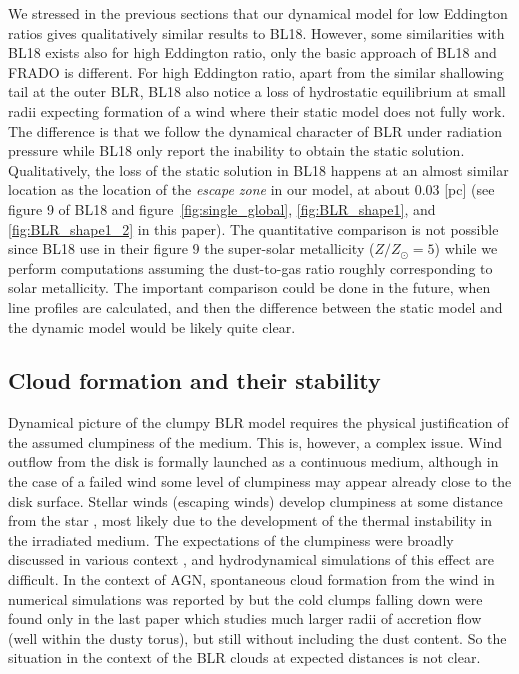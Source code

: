 \documentclass[twocolumn]{aastex62}
\begin{document}
We stressed in the previous sections that our dynamical model for low Eddington ratios gives qualitatively similar results to BL18. However, some similarities with BL18 exists also for high Eddington ratio, only the basic approach of BL18 and FRADO is different. For high Eddington ratio, apart from the similar shallowing tail at the outer BLR, BL18 also notice a loss of hydrostatic equilibrium at small radii expecting formation of a wind where their static model does not fully work. The difference is that we follow the dynamical character of BLR under radiation pressure while BL18 only report the inability to obtain the static solution. Qualitatively, the loss of the static solution in BL18 happens at an almost similar location as the location of the \emph{escape zone} in our model, at about 0.03 [pc] (see figure 9 of BL18 and figure~\ref{fig:single_global}, \ref{fig:BLR_shape1}, and \ref{fig:BLR_shape1_2} in this paper). The quantitative comparison is not possible since BL18 use in their figure 9 the super-solar metallicity ($Z/Z_{\odot} = 5$) while we perform computations assuming the dust-to-gas ratio roughly corresponding to solar metallicity. The important comparison could be done in the future, when line profiles are calculated, and then the difference between the static model and the dynamic model would be likely quite clear.

\subsection{Cloud formation and their stability}\label{sec:stability}

Dynamical picture of the clumpy BLR model requires the physical justification of the assumed clumpiness of the medium. This is, however, a complex issue. Wind outflow from the disk is formally launched as a continuous medium, although in the case of a failed wind some level of clumpiness may appear already close to the disk surface. Stellar winds (escaping winds) develop clumpiness at some distance from the star \citep[e.g.][]{muijres2011}, most likely due to the development of the thermal instability in the irradiated medium. The expectations of the clumpiness were broadly discussed in various context  \citep[see e.g.][and the references therein]{mccourt2018,gronke2020}, and hydrodynamical simulations of this effect are difficult. In the context of AGN, spontaneous cloud formation from the wind in numerical simulations was reported by \citet{Proga2015, WatersProga2016, waters2019,waters2021} but the cold clumps falling down were found only in the last paper which studies much larger radii of accretion flow (well within the dusty torus), but still without including the dust content. So the situation in the context of the BLR clouds at expected distances is not clear.
\end{document}

